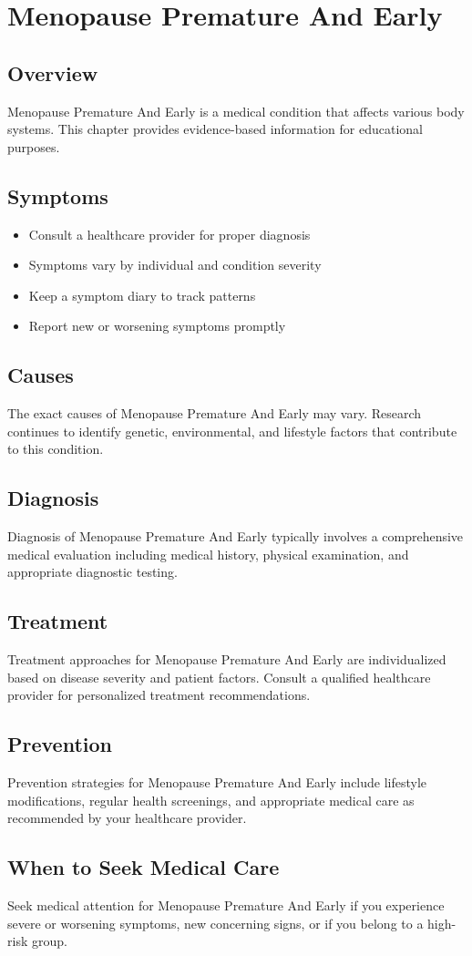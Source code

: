 \chapter{Menopause Premature And Early}

\section*{Overview}
Menopause Premature And Early is a medical condition that affects various body systems. This chapter provides evidence-based information for educational purposes.

\section*{Symptoms}
\begin{itemize}
  \item Consult a healthcare provider for proper diagnosis
  \item Symptoms vary by individual and condition severity
  \item Keep a symptom diary to track patterns
  \item Report new or worsening symptoms promptly
\end{itemize}

\section*{Causes}
The exact causes of Menopause Premature And Early may vary. Research continues to identify genetic, environmental, and lifestyle factors that contribute to this condition.

\section*{Diagnosis}
Diagnosis of Menopause Premature And Early typically involves a comprehensive medical evaluation including medical history, physical examination, and appropriate diagnostic testing.

\section*{Treatment}
Treatment approaches for Menopause Premature And Early are individualized based on disease severity and patient factors. Consult a qualified healthcare provider for personalized treatment recommendations.

\section*{Prevention}
Prevention strategies for Menopause Premature And Early include lifestyle modifications, regular health screenings, and appropriate medical care as recommended by your healthcare provider.

\section*{When to Seek Medical Care}
Seek medical attention for Menopause Premature And Early if you experience severe or worsening symptoms, new concerning signs, or if you belong to a high-risk group.
\clearpage
